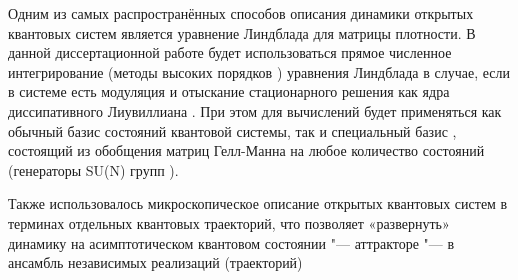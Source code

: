 {\methods} 
Одним из самых распространённых способов описания динамики открытых квантовых систем является уравнение Линдблада \autocite{Lindblad1976, Gorini1976, book2007} для матрицы плотности.
В данной диссертационной работе будет использоваться прямое численное интегрирование (методы высоких порядков \autocite{Lambert1991}) уравнения Линдблада в случае, если в системе есть модуляция и отыскание стационарного решения как ядра диссипативного Лиувиллиана \autocite{Hartmann2017, Nation2015}. При этом для вычислений будет применяться как обычный базис состояний квантовой системы, так и специальный базис \cite{Liniov2019}, состоящий из обобщения матриц Гелл-Манна \autocite{GellMann1962} на любое количество состояний \autocite{Lendi1987} (генераторы SU(N) групп \autocite{Georgi2018}).

Также использовалось микроскопическое описание открытых квантовых систем в терминах отдельных квантовых траекторий, что позволяет «развернуть» динамику на асимптотическом квантовом состоянии "--- аттракторе "--- в ансамбль независимых реализаций (траекторий) \autocite{Dalibard1992, Dum1992, Plenio1998, Volokitin2017}

